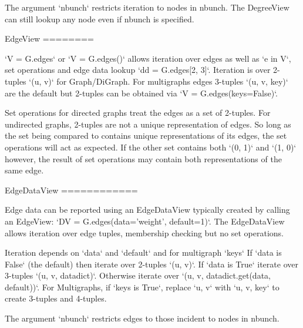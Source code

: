 \begin{DoxyVerb}
    The argument `nbunch` restricts iteration to nodes in nbunch.
    The DegreeView can still lookup any node even if nbunch is specified.

EdgeView
========

    `V = G.edges` or `V = G.edges()` allows iteration over edges as well as
    `e in V`, set operations and edge data lookup `dd = G.edges[2, 3]`.
    Iteration is over 2-tuples `(u, v)` for Graph/DiGraph. For multigraphs
    edges 3-tuples `(u, v, key)` are the default but 2-tuples can be obtained
    via `V = G.edges(keys=False)`.

    Set operations for directed graphs treat the edges as a set of 2-tuples.
    For undirected graphs, 2-tuples are not a unique representation of edges.
    So long as the set being compared to contains unique representations
    of its edges, the set operations will act as expected. If the other
    set contains both `(0, 1)` and `(1, 0)` however, the result of set
    operations may contain both representations of the same edge.

EdgeDataView
============

    Edge data can be reported using an EdgeDataView typically created
    by calling an EdgeView: `DV = G.edges(data='weight', default=1)`.
    The EdgeDataView allows iteration over edge tuples, membership checking
    but no set operations.

    Iteration depends on `data` and `default` and for multigraph `keys`
    If `data is False` (the default) then iterate over 2-tuples `(u, v)`.
    If `data is True` iterate over 3-tuples `(u, v, datadict)`.
    Otherwise iterate over `(u, v, datadict.get(data, default))`.
    For Multigraphs, if `keys is True`, replace `u, v` with `u, v, key`
    to create 3-tuples and 4-tuples.

    The argument `nbunch` restricts edges to those incident to nodes in nbunch.
\end{DoxyVerb}
 